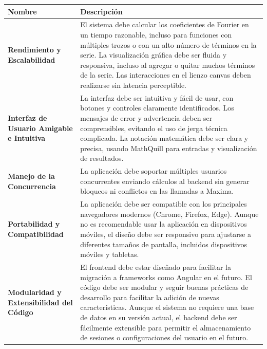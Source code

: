 \begin{longtable}{|m{5cm}|m{10cm}|}
	\hline
	\rowcolor{black!75} \color{white}\textbf{Nombre} & \color{white}\textbf{Descripción} \\
	\hline
	\textbf{Rendimiento y Escalabilidad} & El sistema debe calcular los coeficientes de Fourier en un tiempo razonable, incluso para funciones con múltiples trozos o con un alto número de términos en la serie. La visualización gráfica debe ser fluida y responsiva, incluso al agregar o quitar muchos términos de la serie. Las interacciones en el lienzo canvas deben realizarse sin latencia perceptible. \\
	\hline
	\textbf{Interfaz de Usuario Amigable e Intuitiva} & La interfaz debe ser intuitiva y fácil de usar, con botones y controles claramente identificados. Los mensajes de error y advertencia deben ser comprensibles, evitando el uso de jerga técnica complicada. La notación matemática debe ser clara y precisa, usando MathQuill para entradas y visualización de resultados. \\
	\hline
	\textbf{Manejo de la Concurrencia} & La aplicación debe soportar múltiples usuarios concurrentes enviando cálculos al backend sin generar bloqueos ni conflictos en las llamadas a Maxima. \\
	\hline
	\textbf{Portabilidad y Compatibilidad} & La aplicación debe ser compatible con los principales navegadores modernos (Chrome, Firefox, Edge). Aunque no es recomendable usar la aplicación en dispositivos móviles, el diseño debe ser responsivo para ajustarse a diferentes tamaños de pantalla, incluidos dispositivos móviles y tabletas. \\
	\hline
	\textbf{Modularidad y Extensibilidad del Código} & El frontend debe estar diseñado para facilitar la migración a frameworks como Angular en el futuro. El código debe ser modular y seguir buenas prácticas de desarrollo para facilitar la adición de nuevas características. Aunque el sistema no requiere una base de datos en su versión actual, el backend debe ser fácilmente extensible para permitir el almacenamiento de sesiones o configuraciones del usuario en el futuro. \\

\end{longtable}
